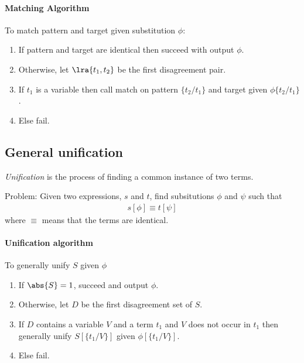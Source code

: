 \documentclass{article}
\begin{document}
\paragraph{Matching Algorithm}

To match pattern and target given substitution $\phi$:

\begin{enumerate}
    \item If pattern and target are identical then succeed with output $\phi$.
    \item Otherwise, let $\lra{t_1, t_2}$ be the first disagreement pair.
    \item If $t_1$ is a variable then call match on pattern $\{t_2/t_1\}$ and target given $\phi\{t_2/t_1\}$.
    \item Else fail.
\end{enumerate}

\subsection{General unification}

\begin{definition}
    \emph{Unification} is the process of finding a common instance of two terms. 

    Problem: Given two expressions, $s$ and $t$, find subsitutions
    $\phi$ and $\psi$ such that
    \begin{align*}
        s[\phi] \equiv t[\psi]
    \end{align*}
    where $\equiv$ means that the terms are identical.
\end{definition}

\paragraph{Unification algorithm}

To generally unify $S$ given $\phi$
\begin{enumerate}
    \item If $\abs{S}=1$, succeed and output $\phi$.
    \item Otherwise, let $D$ be the first disagreement set of $S$.
    \item If $D$ contains a variable $V$ and a term $t_1$ and $V$ 
          does not occur in $t_1$ then generally unify $S[\{t_1/V\}]$ given $\phi[\{t_1/V\}]$.
    \item Else fail.
\end{enumerate}
\end{document}

